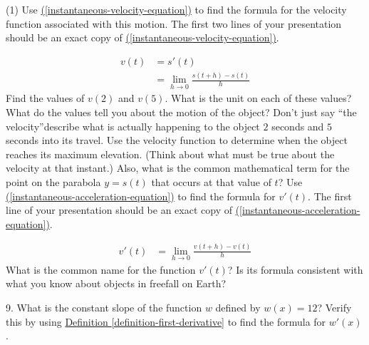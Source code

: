 \documentclass[12pt,]{book}
\theoremstyle{plain}
\theoremstyle{definition}
\numberwithin{equation}{section}
\newcommand{\fe}[2]{#1\mathopen{}\left(#2\right)\mathclose{}}
\newcommand{\fd}[1]{#1'}
\begin{document}
\begin{exercisegroup}(1)
\exercise[4.]\hypertarget{exercise-187}{\null}Use \hyperref[instantaneous-velocity-equation]{(\ref{instantaneous-velocity-equation})} to find the formula for the velocity function associated with this motion. The first two lines of your presentation should be an exact copy of \hyperref[instantaneous-velocity-equation]{(\ref{instantaneous-velocity-equation})}.%
\par
\begin{align}
\fe{v}{t}&=\fe{\fd{s}}{t}\label{instantaneous-velocity-equation}\\
&=\lim_{h\to0}\frac{\fe{s}{t+h}-\fe{s}{t}}{h}\label{mrow-223}
\end{align}%
\exercise[5.]\hypertarget{exercise-188}{\null}Find the values of \(\fe{v}{2}\) and \(\fe{v}{5}\). What is the unit on each of these values? What do the values tell you about the motion of the object? Don't just say ``the velocity''\textemdash{}describe what is actually happening to the object \(2\) seconds and \(5\) seconds into its travel.%
\exercise[6.]\hypertarget{exercise-189}{\null} Use the velocity function to determine when the object reaches its maximum elevation. (Think about what must be true about the velocity at that instant.) Also, what is the common mathematical term for the point on the parabola \(y=\fe{s}{t}\) that occurs at that value of \(t\)?%
\exercise[7.]\hypertarget{exercise-190}{\null}Use \hyperref[instantaneous-acceleration-equation]{(\ref{instantaneous-acceleration-equation})} to find the formula for \(\fe{\fd{v}}{t}\). The first line of your presentation should be an exact copy of \hyperref[instantaneous-acceleration-equation]{(\ref{instantaneous-acceleration-equation})}.%
\par
\begin{align}
\fe{\fd{v}}{t}&=\lim_{h\to0}\frac{\fe{v}{t+h}-\fe{v}{t}}{h}\label{instantaneous-acceleration-equation}
\end{align}%
\exercise[8.]\hypertarget{exercise-191}{\null}What is the common name for the function \(\fe{\fd{v}}{t}\)? Is its formula consistent with what you know about objects in freefall on Earth?%
\end{exercisegroup}
\par\smallskip\noindent
\begin{exerciselist}
\item[9.]\hypertarget{exercise-192}{\null}What is the constant slope of the function \(w\) defined by \(\fe{w}{x}=12\)? Verify this by using \hyperref[definition-first-derivative]{Definition \ref{definition-first-derivative}} to find the formula for \(\fe{\fd{w}}{x}\).%
\par\smallskip
\end{exerciselist}
\typeout{************************************************}
\typeout{************************************************}
\end{document}
